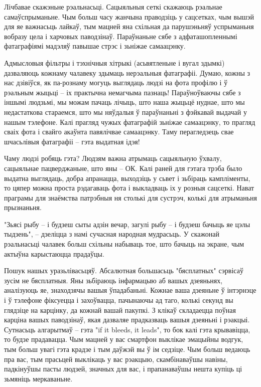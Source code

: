 Лічбавае скажэньне рэальнасьці. Сацыяльныя сеткі скажаюць рэальнае самаўспрыманьне. Чым больш часу жанчына праводзіць у сацсетках, чым вышэй для яе важнасьць лайкаў, тым мацней яна схільная да парушэньняў успрыманьня вобразу цела і харчовых паводзінаў. Параўнаньне сябе з адфаташопленнымі фатаграфіямі мадэляў павышае стрэс і зьніжае самаацэнку.

Адмысловыя фільтры і тэхнічныя хітрыкі (асьвятленьне і вугал здымкі) дазваляюць кожнаму чалавеку здымаць нерэальныя фатаграфіі. Думаю, кожны з нас дзівіўся, як па-рознаму могуць выглядаць людзі на фота профілю і ў рэальным жыцьці – іх практычна немагчыма пазнаць! Параўноўваючы сябе з іншымі людзьмі, мы можам пачаць лічыць, што наша жыцьцё нуднае, што мы недастаткова стараемся, што мы няўдалыя ў параўнаньні з фэйкавай выдачай у нашым тэлефоне. Калі прагляд чужых фатаграфій зьніжае самаацэнку, то прагляд сваіх фота і свайго акаўнта павялічвае самаацэнку. Таму перагледзець свае шчасьлівыя фатаграфіі – гэта выдатная ідэя!

Чаму людзі робяць гэта? Людзям важна атрымаць сацыяльную ўхвалу, сацыяльнае пацверджаньне, што яны – ОК. Калі раней для гэтага трэба было выдатна выглядаць, добра апранацца, выходзіць у сьвет і зьбіраць кампліменты, то цяпер можна проста рэдагаваць фота і выкладваць іх у розныя сацсеткі. Нават праграмы для знаёмства патрэбныя ня столькі для сустрэч, колькі для атрыманьня прызнаньня.

"Зьясі рыбу – і будзеш сыты адзін вечар, загулі рыбу – і будзеш бачыць яе цэлы тыдзень", – дзеліцца з намі сучасная народная мудрасьць. У скажонай рэальнасьці чалавек больш схільны набываць тое, што бачыць на экране, чым актыўна карыстаюцца прадаўцы.

Пошук нашых уразьлівасьцяў. Абсалютная большасьць "бясплатных" сэрвісаў зусім не бясплатныя. Яны зьбіраюць інфармацыю аб вашых дзеяньнях, аналізуюць яе, знаходзячы вашыя ўпадабаньні. Кожнае ваша дзеяньне ў інтэрнэце і ў тэлефоне фіксуецца і захоўвацца, пачынаючы ад таго, колькі секунд вы глядзіце на карцінку, да кожнай вашай пакупкі. З клікаў складаецца поўная карціна вашых паводзінаў, якая дазваляе прадказваць вашыя дзеяньні і рэакцыі. Сутнасьць алгарытмаў – гэта "if it bleeds, it leads", то бок калі гэта крывавіцца, то будзе прадавацца. Чым мацней у вас смартфон выклікае эмацыйны водгук, тым больш увагі гэта крадзе і тым даўжэй вы ў ім седзіце. Чым больш ведаюць пра вас, тым прасьцей выклікаць у вас рэакцыю, скамбінаваўшы навіны, падкінуўшы пасты людзей, значных для вас, і прапанаваўшы нешта купіць ці зьмяніць меркаваньне.

